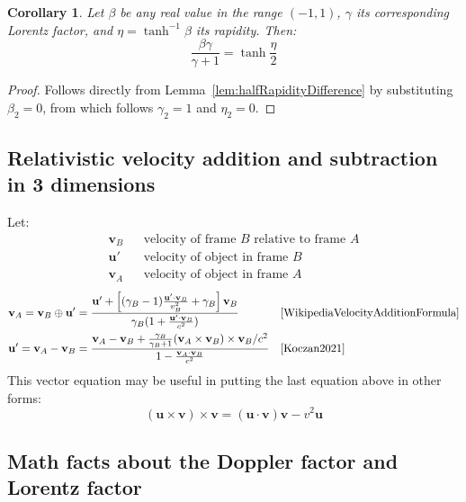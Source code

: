 \documentclass[a4paper]{article}
\theoremstyle{plain}
\newtheorem{corollary}[theorem]{Corollary}
\theoremstyle{definition}
\newcommand{\vect}[1]{\mathbf{#1}}
\begin{document}
\begin{corollary}
Let $\beta$ be any real value in the range $(-1,1)$, $\gamma$ its
corresponding Lorentz factor, and $\eta = \tanh^{-1} \beta$ its
rapidity.
Then:
\begin{equation}
\frac{\beta \gamma}{\gamma + 1} = \tanh \frac{\eta}{2}
\end{equation}
\end{corollary}

\begin{proof}
Follows directly from Lemma~\ref{lem:halfRapidityDifference} by
substituting $\beta_2 =0$, from which follows $\gamma_2 = 1$ and
$\eta_2=0$.
\end{proof}


\subsection{Relativistic velocity addition and subtraction in 3 dimensions}
\label{app:3drelvelocityadd}

Let:
\begin{align*}
  \vect{v}_B & & \text{velocity of frame $B$ relative to frame $A$} \\
  \vect{u}' & & \text{velocity of object in frame $B$} \\
  \vect{v}_A & & \text{velocity of object in frame $A$}
\end{align*}
\begin{align}
\vect{v}_A = \vect{v}_B \oplus \vect{u}'
  & = \frac{ \vect{u}' + \left[ (\gamma_B-1) \frac{\vect{u}' \cdot \vect{v}_B}{v_B^2} + \gamma_B \right] \vect{v}_B }
           { \gamma_B (1 + \frac{\vect{u}' \cdot \vect{v}_B}{c^2}) } & & \text{\cite{WikipediaVelocityAdditionFormula}} \\
\vect{u}' = \vect{v}_A - \vect{v}_B
  & = \frac{ \vect{v}_A - \vect{v}_B + \frac{\gamma_B}{\gamma_B+1} (\vect{v}_A \times \vect{v}_B) \times \vect{v}_B / c^2 }
           { 1 - \frac{\vect{v}_A \cdot \vect{v}_B}{c^2} } & & \text{\cite{Koczan2021}}
\end{align}
This vector equation may be useful in putting the last equation above
in other forms:
\begin{equation}
(\vect{u} \times \vect{v}) \times \vect{v} = (\vect{u} \cdot \vect{v}) \vect{v} - v^2 \vect{u}
\end{equation}


\subsection{Math facts about the Doppler factor and Lorentz factor}
\label{app:DopplerFactor}
\end{document}
